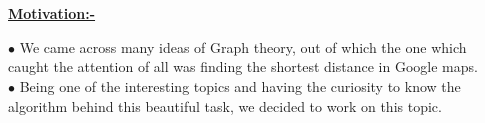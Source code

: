 \documentclass[23pt]{article}
\begin{document}
\section*{\hyperlink{target:Graph Representation}{\textcolor{blue}
{\underline{}}}}\label{sec:Graph Representation}

\section*{\hyperlink{target:Shortest Path Calculation}{\textcolor{blue}
{\underline{}}}}\label{sec:Shortest Path Calculation}

\section*{\hyperlink{target:Shortest Path Retrieval}{\textcolor{blue}
{\underline{}}}}\label{sec:Shortest Path Retrieval}

\section*{\hyperlink{target:SOLUTION}{\textcolor{blue}
{\underline{}}}}\label{sec:SOLUTION}

\section*{\hyperlink{target:CODE}{\textcolor{blue}
{\underline{}}}}\label{sec:CODE}

\section*{\hyperlink{target:REFERENCES}{\textcolor{blue}
{\underline{}}}}\label{sec:REFERENCES}

\newpage
\begin{center}
\centering  \item \textbf{\huge\underline{Motivation:-}} 
\end{center}
\Large
$\bullet$ We came across many ideas of Graph theory, out of which the one which caught the attention of all was finding the shortest distance in Google maps. \\
$\bullet$ Being one of the interesting topics and having the curiosity to know the algorithm behind this beautiful task, we decided to work on this topic.
\end{document}
